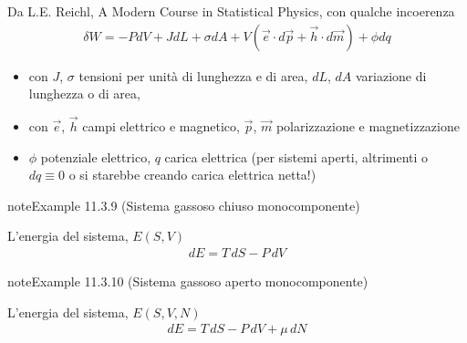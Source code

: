 \documentclass[letterpaper,10pt,italian]{jupyterBook}
\begin{document}
\sphinxAtStartPar
Da L.E. Reichl, A Modern Course in Statistical Physics, con qualche incoerenza  
\begin{equation*}
\begin{split}\delta W = - P dV + J dL + \sigma d A + V \left( \vec{e} \cdot d \vec{p} + \vec{h} \cdot d \vec{m}\right) + \phi d q \end{split}
\end{equation*}\begin{itemize}
\item {} 
\sphinxAtStartPar
con \(J\), \(\sigma\) tensioni per unità di lunghezza e di area, \(d L \), \(d A\) variazione di lunghezza o di area,

\item {} 
\sphinxAtStartPar
con \(\vec{e}\), \(\vec{h}\) campi elettrico e magnetico, \(\vec{p}\), \(\vec{m}\) polarizzazione e magnetizzazione

\item {} 
\sphinxAtStartPar
\(\phi\) potenziale elettrico, \(q\) carica elettrica (per sistemi aperti, altrimenti o \(dq \equiv 0\) o si starebbe creando carica elettrica netta!)

\end{itemize}
\label{ch/thermodynamics/principles-gibbs-phase-rule:example-11}
\begin{sphinxadmonition}{note}{Example 11.3.9 (Sistema gassoso chiuso monocomponente)}



\sphinxAtStartPar
L’energia del sistema, \(E(S,V)\)
\begin{equation*}
\begin{split}dE = T \, dS - P \, dV\end{split}
\end{equation*}\end{sphinxadmonition}
\label{ch/thermodynamics/principles-gibbs-phase-rule:example-12}
\begin{sphinxadmonition}{note}{Example 11.3.10 (Sistema gassoso aperto monocomponente)}



\sphinxAtStartPar
L’energia del sistema, \(E(S,V,N)\)
\begin{equation*}
\begin{split}dE = T \, dS - P \, dV + \mu \, dN\end{split}
\end{equation*}\end{sphinxadmonition}
\label{ch/thermodynamics/principles-gibbs-phase-rule:example-13}
\end{document}

